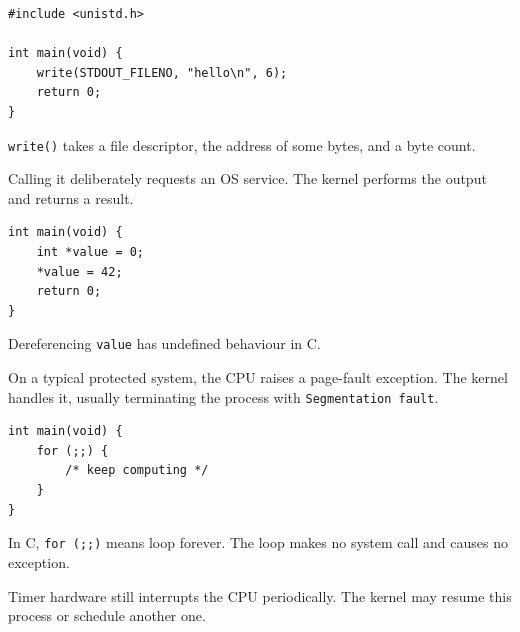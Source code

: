 \begin{slide}


	\begin{verbatim}
#include <unistd.h>

int main(void) {
    write(STDOUT_FILENO, "hello\n", 6);
    return 0;
}
	\end{verbatim}


	\texttt{write()} takes a file descriptor, the address of some bytes, and a byte count.

	\medskip

	Calling it deliberately requests an OS service. The kernel performs the output and returns a result.

\end{slide}

\begin{slide}


	\begin{verbatim}
int main(void) {
    int *value = 0;
    *value = 42;
    return 0;
}
	\end{verbatim}


	Dereferencing \texttt{value} has undefined behaviour in C.

	\medskip

	On a typical protected system, the CPU raises a page-fault exception. The kernel handles it, usually terminating the process with \texttt{Segmentation fault}.

\end{slide}

\begin{slide}


	\begin{verbatim}
int main(void) {
    for (;;) {
        /* keep computing */
    }
}
	\end{verbatim}


	In C, \texttt{for (;;)} means loop forever. The loop makes no system call and causes no exception.

	\medskip

	Timer hardware still interrupts the CPU periodically. The kernel may resume this process or schedule another one.

\end{slide}

